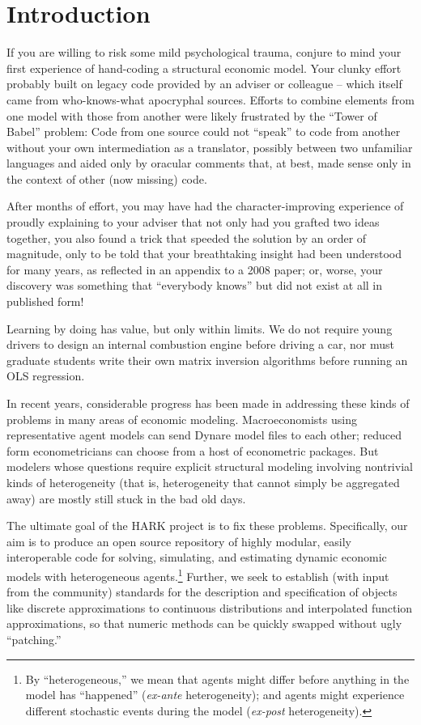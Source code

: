 \documentclass[12pt,titlepage,letterpaper]{econtex}
\begin{document}
\thispagestyle{empty}
\newpage

\tableofcontents

\newpage

\section{Introduction}\label{sec:Introduction}

If you are willing to risk some mild psychological trauma, conjure to mind your first experience of hand-coding a structural economic model.  Your clunky effort probably built on legacy code provided by an adviser or colleague -- which itself came from who-knows-what apocryphal sources.  Efforts to combine elements from one model with those from another were likely frustrated by the ``Tower of Babel'' problem: Code from one source could not ``speak'' to code from another without your own intermediation as a translator, possibly between two unfamiliar languages and aided only by oracular comments that, at best, made sense only in the context of other (now missing) code.

After months of effort, you may have had the character-improving experience of proudly explaining to your adviser that not only had you grafted two ideas together, you also found a trick that speeded the solution by an order of magnitude, only to be told that your breathtaking insight had been understood for many years, as reflected in an appendix to a 2008 paper; or, worse, your discovery was something that ``everybody knows'' but did not exist at all in published form!

Learning by doing has value, but only within limits.  We do not require young drivers to design an internal combustion engine before driving a car, nor must graduate students write their own matrix inversion algorithms before running an OLS regression.  

In recent years, considerable progress has been made in addressing these kinds of problems in many areas of economic modeling.  Macroeconomists using representative agent models can send Dynare model files to each other; reduced form econometricians can choose from a host of econometric packages.  But modelers whose questions require explicit structural modeling involving nontrivial kinds of heterogeneity (that is, heterogeneity that cannot simply be aggregated away) are mostly still stuck in the bad old days.

The ultimate goal of the HARK project is to fix these problems.  Specifically, our aim is to produce an open source repository of highly modular, easily interoperable code for solving, simulating, and estimating dynamic economic models with heterogeneous agents.\footnote{By ``heterogeneous,'' we mean that agents might differ before anything in the model has ``happened'' (\textit{ex-ante} heterogeneity); and agents might experience different stochastic events during the model (\textit{ex-post} heterogeneity).}  Further, we seek to establish (with input from the community) standards for the description and specification of objects like discrete approximations to continuous distributions and interpolated function approximations, so that numeric methods can be quickly swapped without ugly ``patching.''
\end{document}

